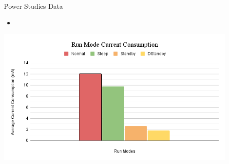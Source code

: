 \begin{frame}{Power Studies Data}
    \begin{itemize}
        \item 
    \end{itemize}
    \includegraphics[height=0.5\textheight,width=0.9\textwidth,keepaspectratio]{images/run_modes.png}
\end{frame}
    



